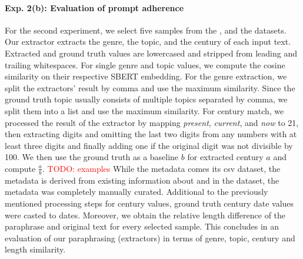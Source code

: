 \paragraph{Exp. 2(b): Evaluation of prompt adherence}
For the second experiment, we select five samples from the \dataBlog{}, \dataGutenberg{} and the \dataStudent{} datasets. 
Our extractor extracts the genre, the topic, and the century of each input text.
Extracted and ground truth values are lowercased and stripped from leading and trailing whitespaces. 
For single genre and topic values, we compute the cosine similarity on their respective SBERT embedding.
For the genre extraction, we split the extractors' result by comma and use the maximum similarity.
Since the ground truth topic usually consists of multiple topics separated by comma, we split them into a list and use the maximum similarity.
For century match, we processed the result of the extractor by mapping \textit{present}, \textit{current}, and \textit{now} to 21, then extracting digits and omitting the last two digits from any numbers with at least three digits and finally adding one if the original digit was not divisible by 100.
We then use the ground truth as a baseline $b$ for extracted century $a$ and compute $\frac{a}{b}$.
\textcolor{red}{TODO: examples}
While the \dataBlog{} metadata comes its csv dataset, the \dataStudent{} metadata is derived from existing information about and in the dataset, the \dataGutenberg{} metadata was completely manually curated.
Additional to the previously mentioned processing steps for century values, ground truth century date values were casted to dates.
Moreover, we obtain the relative length difference of the paraphrase and original text for every selected sample. 
This concludes in an evaluation of our paraphrasing (extractors) in terms of genre, topic, century and length similarity.